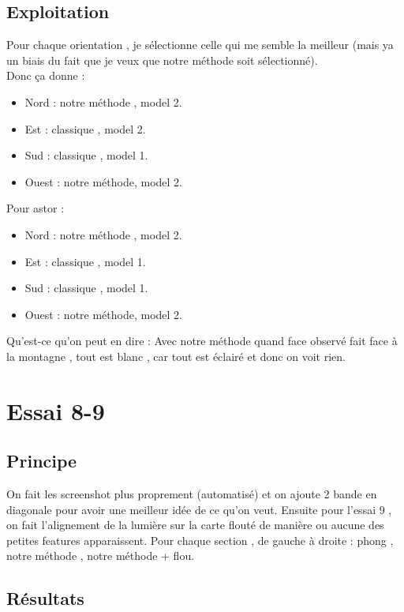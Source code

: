 \documentclass[a4paper]{article}
\begin{document}
\subsection{Exploitation}
Pour chaque orientation , je sélectionne celle qui me semble la meilleur (mais ya un biais du fait que je veux que notre méthode soit sélectionné).\\
Donc ça donne :
\begin{itemize}
\item Nord : notre méthode , model 2.
\item Est : classique , model 2.
\item Sud : classique , model 1.
\item Ouest : notre méthode, model 2. 
\end{itemize} 

Pour astor : 
\begin{itemize}
\item Nord : notre méthode , model 2.
\item Est : classique , model 1.
\item Sud : classique , model 1.
\item Ouest : notre méthode, model 2. 
\end{itemize} 



Qu'est-ce qu'on peut en dire :
Avec notre méthode quand face observé fait face à la montagne , tout est blanc , car tout est éclairé et donc on voit rien.


\section{Essai 8-9}
\subsection{Principe}
On fait les screenshot plus proprement (automatisé) et on ajoute 2 bande en diagonale pour avoir une meilleur idée de ce qu'on veut. 
Ensuite pour l'essai 9 , on fait l'alignement de la lumière sur la carte flouté de manière ou aucune des petites features apparaissent.
Pour chaque section , de gauche à droite : phong , notre méthode , notre méthode + flou.  

\subsection{Résultats}
\end{document}
